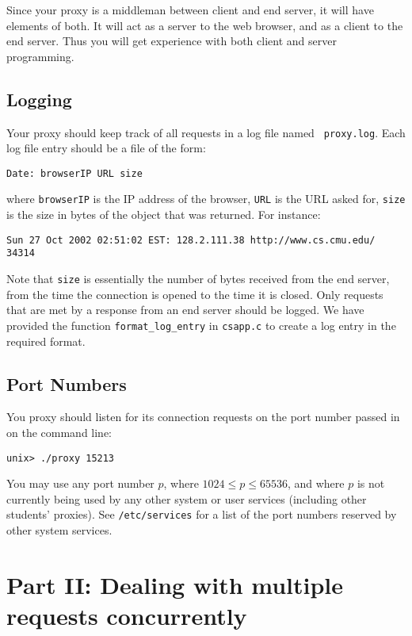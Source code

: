 \documentclass[11pt]{article}
\begin{document}
Since your proxy is a middleman between client and end server, it will
have elements of both. It will act as a server to the web browser, and
as a client to the end server. Thus you will get experience with both
client and server programming.

\subsection*{Logging}

Your proxy should keep track of all requests in a log file named {\tt
proxy.log}. Each log file entry should be a file of the form:

\begin{verbatim}
Date: browserIP URL size
\end{verbatim}

where \texttt{browserIP} is the IP address of the browser, \texttt{URL} is the
URL asked for, \texttt{size} is the size in bytes of the object that was
returned.  For instance:

\begin{verbatim}
Sun 27 Oct 2002 02:51:02 EST: 128.2.111.38 http://www.cs.cmu.edu/ 34314
\end{verbatim}

Note that \texttt{size} is essentially the number of bytes received
from the end server, from the time the connection is opened to the time it
is closed. Only requests that are met by a response from an end server
should be logged.  We have provided the function \texttt{format\_log\_entry} 
in \texttt{csapp.c} to create a log entry in the required format.

\subsection*{Port Numbers}

You proxy should listen for its connection requests on the port number
passed in on the command line:
\begin{verbatim}
unix> ./proxy 15213
\end{verbatim}
You may use any port number $p$, where $1024 \le  p \le 65536$, and
where $p$ is not currently being used by any other system or user services
(including other students' proxies). See \texttt{/etc/services} for a
list of the port numbers reserved by other system services.

\section*{Part II: Dealing with multiple requests concurrently}
\end{document}
